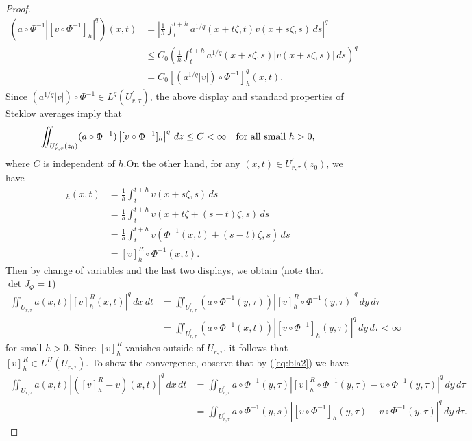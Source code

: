 \documentclass[10pt,a4paper]{amsart}
\numberwithin{equation}{section}
\begin{document}
\begin{proof}
\begin{align} \label{eq:bla3}
\left(a\circ\Phi^{-1}\left|[v\circ\Phi^{-1}]_{h}\right|^{q}\right)(x,t) & =\left|\frac{1}{h}\int_{t}^{t+h}a^{1/q}(x+t\zeta,t)v(x+s\zeta,s)\, ds\right|^{q}\nonumber\\ 
 & \leq C_{0}\left(\frac{1}{h}\int_{t}^{t+h}a^{1/q}(x+s\zeta,s)\left|v(x+s\zeta,s)\right|\, ds\right)^{q} \nonumber \\ 
 & =C_{0}[(a^{1/q}\left|v\right|)\circ\Phi^{-1}]_{h}^{q}(x,t).
\end{align}
Since $(a^{1/q}\left|v\right|)\circ\Phi^{-1}\in L^{q}(U_{r, \tau}^{\prime})$,
the above display and standard properties of Steklov averages imply
that
\[
\iint_{U^{\prime}_{r, \tau}(z_0)}(a\circ\Phi^{-1})\left|[v\circ\Phi^{-1}]_{h}\right|^{q}\, dz\leq C<\infty \quad\text{for all small \ensuremath{h>0,}}
\]
where $C$ is independent of $h$.On the other hand, for any $(x,t)\in U^{\prime}_{r, \tau} (z_0)$, we have
\begin{align}
[v\circ\Phi^{-1}]_{h}(x,t) & =\frac{1}{h}\int_{t}^{t+h}v(x+s\zeta,s)\,ds\nonumber \\
 & =\frac{1}{h}\int_{t}^{t+h}v(x+t\zeta+(s-t)\zeta,s)\, ds\nonumber \\
 & =\frac{1}{h}\int_{t}^{t+h}v(\Phi^{-1}(x,t)+(s-t)\zeta,s)\,ds\nonumber \\
 & =[v]_{h}^{R}\circ\Phi^{-1}(x,t).\label{eq:bla2}
\end{align}
Then by change of variables and the last two displays, we obtain (note that $\det J_{\Phi}=1$)
\begin{align*}
\iint_{U_{r, \tau}}a(x, t)\left|[v]_{h}^{R}(x, t)\right|^{q}\,dx\, dt & =\iint_{U_{r, \tau}^{\prime}}(a\circ\Phi^{-1}(y, \tau))\left|[v]_{h}^{R}\circ\Phi^{-1}(y, \tau)\right|^{q}\,dy\, d\tau\\
 & =\iint_{U_{r, \tau}^{\prime}}(a\circ\Phi^{-1}(x, t))\left|[v\circ\Phi^{-1}]_{h}(y, \tau)\right|^{q}\,dy\,d\tau<\infty
\end{align*}
for small $h>0$. Since $[v]_{h}^{R}$ vanishes outside of $U_{r, \tau}$,
it follows that $[v]_{h}^{R}\in L^{H}(U_{r, \tau})$. To show the convergence, observe that by (\ref{eq:bla2}) we have
\begin{align}
\iint_{U_{r, \tau}}a(x , t)\left|([v]_{h}^{R}-v)(x, t)\right|^{q}\,dx\, dt & =\iint_{U^{\prime}_{r, \tau}}a\circ\Phi^{-1}(y, \tau)\left|[v]_{h}^{R}\circ\Phi^{-1}(y, \tau)-v\circ\Phi^{-1}(y, \tau)\right|^{q}\,dy\, d\tau\nonumber \\
 & =\iint_{U^{\prime}_{r, \tau}}a\circ\Phi^{-1}(y,s)\left|[v\circ\Phi^{-1}]_{h}(y, \tau)-v\circ\Phi^{-1}(y, \tau)\right|^{q}\,dy\,d\tau.\label{eq:convegence}

\end{align}
\end{proof}
\end{document}
